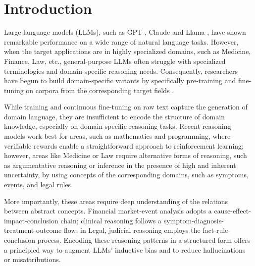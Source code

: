 
\section{Introduction}
 
Large language models (LLMs), such as GPT \cite{DBLP:journals/corr/abs-2303-08774}, Claude \cite{anthropic2023claude} and Llama \cite{DBLP:journals/corr/abs-2307-09288}, have shown remarkable performance on a wide range of natural language tasks. However, when the target applications are in highly specialized domains, such as Medicine, Finance, Law, etc., general-purpose LLMs often struggle with specialized terminologies and domain‑specific reasoning needs. Consequently, researchers have begun to build domain‑specific variants by specifically pre‑training and fine-tuning on corpora from the corresponding target fields \cite{singhal2023large,Singhal:2025aa,xie-etal-2024-efficient,DBLP:conf/nips/ColomboPBMHMCCD24}.


While training and continuous fine-tuning on raw text capture the generation of domain language, they are insufficient to encode the structure of domain knowledge, especially on domain-specific reasoning tasks. Recent reasoning models work best for areas, such as mathematics and programming, where verifiable rewards enable a straightforward approach to reinforcement learning; however, areas like Medicine or Law require alternative forms of reasoning, such as argumentative reasoning or inference in the presence of high and inherent uncertainty, by using concepts of the corresponding domains, such as symptoms, events, and legal rules.

More importantly, these areas require deep understanding of the relations between abstract concepts. Financial market-event analysis adopts a cause-effect-impact-conclusion chain; clinical reasoning follows a symptom-diagnosis-treatment-outcome flow; in Legal, judicial reasoning employs the fact-rule-conclusion process. Encoding these reasoning patterns in a structured form offers a principled way to augment LLMs' inductive bias and to reduce hallucinations or misattributions.

